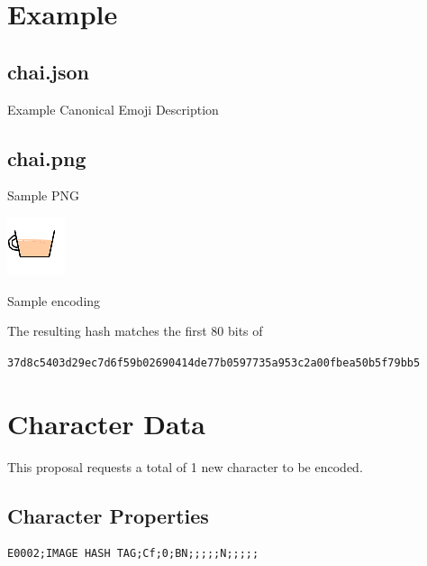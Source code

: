 \documentclass[12pt]{article}
\begin{document}
\section{Example}

\subsection{chai.json}

Example Canonical Emoji Description



\subsection{chai.png}

Sample PNG

\includegraphics{chai.png}

Sample encoding



%


The resulting hash matches the first 80 bits of 

\small{\texttt{37d8c5403d29ec7d6f59b02690414de77b0597735a953c2a00fbea50b5f79bb5}}

\section{Character Data}

This proposal requests a total of 1 new character to be encoded.

\subsection{Character Properties}

\begin{verbatim}
E0002;IMAGE HASH TAG;Cf;0;BN;;;;;N;;;;;
\end{verbatim}


%
\end{document}
